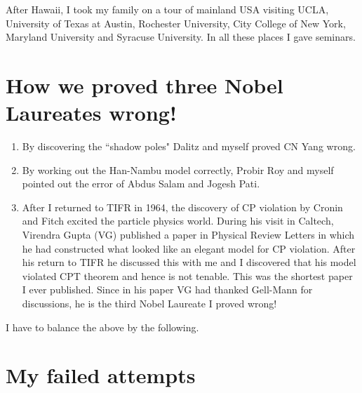 After Hawaii, I took my family on a tour of mainland USA visiting UCLA, 
University of Texas at Austin, Rochester University, City College of New 
York, Maryland University and Syracuse University. In all these places I 
gave seminars.

\section*{How we proved three Nobel Laureates wrong!}

\begin{enumerate}
\item By discovering the ``shadow poles" Dalitz and myself proved CN Yang 
wrong.

\item By working out the Han-Nambu model correctly, Probir Roy and myself 
pointed out the error of Abdus Salam and Jogesh Pati.

\item After I returned to TIFR in 1964, the discovery of CP violation by 
Cronin and Fitch excited the particle physics world. During his visit in 
Caltech, Virendra Gupta (VG) published a paper in Physical Review 
Letters in which he had constructed what looked like an elegant model 
for CP violation. After his return to TIFR he discussed this with me and 
I discovered that his model violated CPT theorem and hence is not 
tenable. This was the shortest paper I ever published. Since in his 
paper VG had thanked Gell-Mann for discussions, he is the third Nobel 
Laureate I proved wrong!
\end{enumerate}

I have to balance the above by the following.

\section*{My failed attempts}

